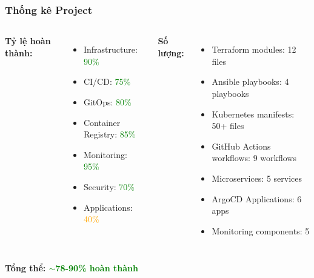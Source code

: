 \documentclass[aspectratio=169]{beamer}
\begin{document}
\begin{frame}
\frametitle{Thống kê Project}
\begin{columns}
\textbf{Tỷ lệ hoàn thành:}
\begin{itemize}
    \item Infrastructure: \textcolor{green}{90\%}
    \item CI/CD: \textcolor{green}{75\%}
    \item GitOps: \textcolor{green}{80\%}
    \item Container Registry: \textcolor{green}{85\%}
    \item Monitoring: \textcolor{green}{95\%}
    \item Security: \textcolor{green}{70\%}
    \item Applications: \textcolor{orange}{40\%}
\end{itemize}

\textbf{Số lượng:}
\begin{itemize}
    \item Terraform modules: 12 files
    \item Ansible playbooks: 4 playbooks
    \item Kubernetes manifests: 50+ files
    \item GitHub Actions workflows: 9 workflows
    \item Microservices: 5 services
    \item ArgoCD Applications: 6 apps
    \item Monitoring components: 5
\end{itemize}
\end{columns}

\vspace{0.5cm}
\begin{center}
\textbf{Tổng thể: \textcolor{green}{$\sim$78-90\% hoàn thành}}
\end{center}
\end{frame}
\end{document}
